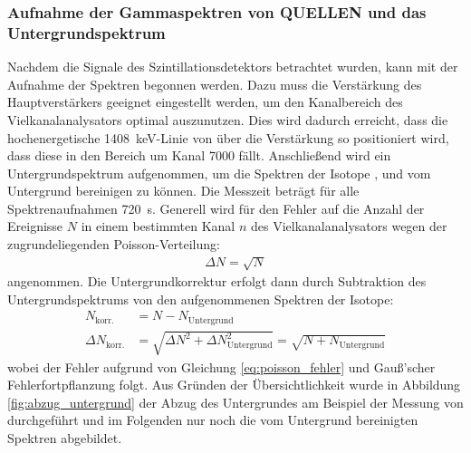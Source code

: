 \documentclass[11pt, a4paper]{article}
\numberwithin{equation}{section}
\begin{document}
\subsubsection{Aufnahme der Gammaspektren von QUELLEN und das Untergrundspektrum}
Nachdem die Signale des Szintillationsdetektors betrachtet wurden, kann mit der Aufnahme der Spektren begonnen werden.
Dazu muss die Verstärkung des Hauptverstärkers geeignet eingestellt werden, um den Kanalbereich des Vielkanalanalysators optimal auszunutzen.
Dies wird dadurch erreicht, dass die hochenergetische \SI{1408}{keV}-Linie von  über die Verstärkung so positioniert wird, dass diese in den Bereich um Kanal 7000 fällt.
Anschließend wird ein Untergrundspektrum aufgenommen, um die Spektren der Isotope ,  und  vom Untergrund bereinigen zu können.
Die Messzeit beträgt für alle Spektrenaufnahmen \SI{720}{\second}.
Generell wird für den Fehler auf die Anzahl der Ereignisse $N$ in einem bestimmten Kanal $n$ des Vielkanalanalysators wegen der zugrundeliegenden Poisson-Verteilung:
\begin{align}
\label{eq:poisson_fehler}
\Delta N = \sqrt{N}
\end{align}
angenommen.
Die Untergrundkorrektur erfolgt dann durch Subtraktion des Untergrundspektrums von den aufgenommenen Spektren der Isotope:
\begin{align}
	\label{eq:untergrundkorr_fehler}
	N_\mathrm{korr.} &= N - N_\mathrm{Untergrund}  \nonumber\\
	\Delta N_\mathrm{korr.} &= \sqrt{\Delta N^2 + \Delta N_\mathrm{Untergrund}^2} = \sqrt{N + N_\mathrm{Untergrund}}
\end{align}
wobei der Fehler aufgrund von Gleichung \ref{eq:poisson_fehler} und Gauß'scher Fehlerfortpflanzung folgt.
Aus Gründen der Übersichtlichkeit wurde in Abbildung \ref{fig:abzug_untergrund} der Abzug des Untergrundes am Beispiel der Messung von  durchgeführt und im Folgenden nur noch die vom Untergrund bereinigten Spektren abgebildet.
\end{document}
